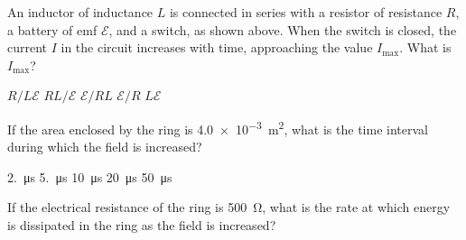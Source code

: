 \documentclass[12pt]{../../oss-classkick-exam}
\begin{document}
\begin{questions}
  \uplevel{ \rule{\linewidth}{.5pt}}
  
  \question An inductor of inductance $L$ is connected in series with a
  resistor of resistance $R$, a battery of emf $\mathcal{E}$, and a switch, as
  shown above. When the switch is closed, the current $I$ in the circuit
  increases with time, approaching the value $I_\text{max}$. What is
  $I_\text{max}$?
  
  \begin{minipage}{.4\textwidth}
  \end{minipage}
  \begin{minipage}{.4\linewidth}
    \begin{choices}
      \choice $R/L\mathcal{E}$
      \choice $RL/\mathcal{E}$
      \choice $\mathcal{E}/RL$
      \choice $\mathcal{E}/R$
      \choice $L\mathcal{E}$
    \end{choices}
  \end{minipage}


  
  \question If the area enclosed by the ring is \SI{4.0e-3}{\metre\squared},
  what is the time interval during which the field is increased?
  \label{emf1}
  
  \begin{oneparchoices}
    \choice \SI{2.}{\micro\second}\hspace{.3in}
    \choice \SI{5.}{\micro\second}\hspace{.3in}
    \choice \SI{10}{\micro\second}\hspace{.3in}
    \choice \SI{20}{\micro\second}\hspace{.3in}
    \choice \SI{50}{\micro\second}
  \end{oneparchoices}
  \vspace{.3in}

  \question If the electrical resistance of the ring is \SI{500}{\ohm}, what is
  the rate at which energy is dissipated in the ring as the field is increased?
  \label{emf2}
  

\end{questions}
\end{document}
